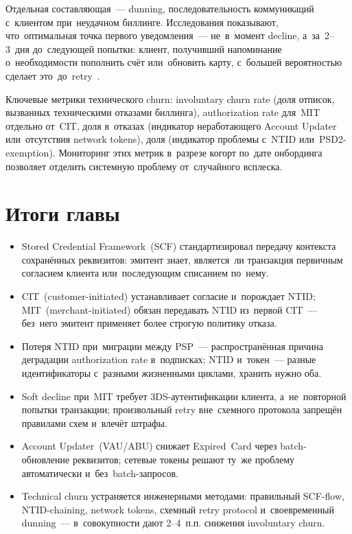 Отдельная составляющая~--- dunning, последовательность коммуникаций
с~клиентом при~неудачном биллинге. Исследования показывают, что~оптимальная
точка первого уведомления~--- не~в~момент decline, а~за~2--3~дня до~следующей
попытки: клиент, получивший напоминание о~необходимости пополнить счёт
или~обновить карту, с~большей вероятностью сделает это~до~retry~.

\begin{practice}
  Ключевые метрики технического churn: involuntary churn rate
  (доля отписок, вызванных техническими отказами биллинга), authorization
  rate для~MIT отдельно от~CIT, доля  в~отказах (индикатор неработающего
  Account Updater или~отсутствия network tokens), доля  (индикатор
  проблемы с~NTID или~PSD2-exemption). Мониторинг этих метрик в~разрезе
  когорт по~дате онбординга позволяет отделить системную проблему
  от~случайного всплеска.
\end{practice}


\section*{Итоги главы}

\begin{itemize}
  \item Stored Credential Framework~(SCF) стандартизировал передачу
        контекста сохранённых реквизитов: эмитент знает, является~ли
        транзакция первичным согласием клиента или~последующим списанием
        по~нему.
  \item CIT~(customer-initiated) устанавливает согласие и~порождает
        NTID; MIT~(merchant-initiated) обязан передавать NTID из~первой
        CIT~--- без~него эмитент применяет более строгую политику отказа.
  \item Потеря NTID при~миграции между PSP~--- распространённая причина
        деградации authorization rate в~подписках; NTID и~токен~---
        разные идентификаторы с~разными жизненными циклами, хранить
        нужно оба.
  \item Soft decline  при~MIT требует 3DS-аутентификации клиента,
        а~не~повторной попытки транзакции; произвольный retry вне~схемного
        протокола запрещён правилами схем и~влечёт штрафы.
  \item Account Updater~(VAU/ABU) снижает  Expired~Card через
        batch-обновление реквизитов; сетевые токены решают ту~же проблему
        автоматически и~без~batch-запросов.
  \item Technical churn устраняется инженерными методами: правильный
        SCF-flow, NTID-chaining, network tokens, схемный retry
        protocol и~своевременный dunning~--- в~совокупности дают
        2--4~п.п. снижения involuntary churn.
\end{itemize}
